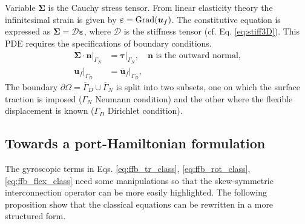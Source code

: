 \begin{itemize}
\begin{equation}
	\end{equation}
	Variable $\bm\Sigma$ is the Cauchy stress tensor. From linear elasticity theory the infinitesimal strain is given by $\bm\varepsilon = \operatorname*{Grad}(\bm{u}_f)$. The constitutive equation is expressed as $\bm\Sigma =  \bm{\mathcal{D}} \bm\varepsilon$, where $ \bm{\mathcal{D}}$ is the stiffness tensor (cf. Eq. \eqref{eq:stiff3D}). This PDE requires the specifications of boundary conditions.
	\begin{equation}
	\label{eq:bc_Elas_MB}
	\begin{aligned}
	\bm\Sigma \cdot \bm{n}|_{\Gamma_N} &= \bm\tau|_{\Gamma_N}, \quad \text{$\bm{n}$ is the outward normal,} \\
	\bm{u}_f|_{\Gamma_D} &= \bm{\bar{u}}_f|_{\Gamma_D},
	\end{aligned}
	\end{equation}
	The boundary $\partial \Omega = \overline{\Gamma}_D \cup \overline{\Gamma}_N$ is split into two subsets, one on which the surface traction is imposed ($\Gamma_N$ Neumann condition) and the other where the flexible displacement is known ($\Gamma_D$ Dirichlet condition).
\end{itemize}

\subsection{Towards a port-Hamiltonian formulation}
The gyroscopic terms in Eqs. \eqref{eq:ffb_tr_class}, \eqref{eq:ffb_rot_class}, \eqref{eq:ffb_flex_class} need some manipulations so that the skew-symmetric interconnection operator can be more easily highlighted. The following proposition show that the classical equations can be rewritten in a more structured form.

